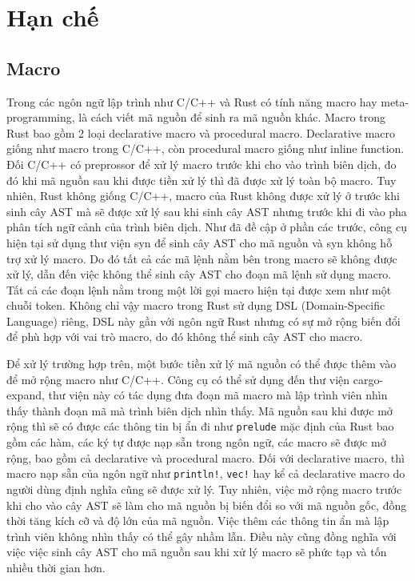 \section{Hạn chế}

\subsection{Macro}

Trong các ngôn ngữ lập trình như C/C++ và Rust có tính năng macro hay meta-programming, là cách viết mã nguồn để sinh ra mã nguồn khác.
Macro trong Rust bao gồm 2 loại declarative macro và procedural macro.
Declarative macro giống như macro trong C/C++, còn procedural macro giống như inline function.
Đối C/C++ có preprossor để xử lý macro trước khi cho vào trình biên dịch, đo đó khi mã nguồn sau khi được tiền xử lý thì đã được xử lý toàn bộ macro.
Tuy nhiên, Rust không giống C/C++, macro của Rust \cite{rustlangMacrosRust} không được xử lý ở trước khi sinh cây AST mà sẽ được xử lý sau khi sinh cây AST nhưng trước khi đi vào pha phân tích ngữ cảnh của trình biên dịch.
Như đã đề cập ở phần các trước, công cụ hiện tại sử dụng thư viện syn để sinh cây AST cho mã nguồn và syn không hỗ trợ xử lý macro.
Do đó tất cả các mã lệnh nằm bên trong macro sẽ không được xử lý, dẫn đến việc không thể sinh cây AST cho đoạn mã lệnh sử dụng macro.
Tất cả các đoạn lệnh nằm trong một lời gọi macro hiện tại được xem như một chuỗi token.
Không chỉ vậy macro trong Rust sử dụng DSL (Domain-Specific Language) riêng, DSL này gần với ngôn ngữ Rust nhưng có sự mở rộng biến đổi để phù hợp với vai trò macro, do đó không thể sinh cây AST cho macro.

Để xử lý trường hợp trên, một bước tiền xử lý mã nguồn có thể được thêm vào để mở rộng macro như C/C++.
Công cụ có thể sử dụng đến thư viện cargo-expand, thư viện này có tác dụng đưa đoạn mã macro mà lập trình viên nhìn thấy thành đoạn mã mà trình biên dịch nhìn thấy.
Mã nguồn sau khi được mở rộng thì sẽ có được các thông tin bị ẩn đi như \texttt{prelude} mặc định của Rust bao gồm các hàm, các ký tự được nạp sẵn trong ngôn ngữ, các macro sẽ được mở rộng, bao gồm cả declarative và procedural macro.
Đối với declarative macro, thì macro nạp sẵn của ngôn ngữ như \texttt{println!}, \texttt{vec!} hay kể cả declarative macro do người dùng định nghĩa cũng sẽ được xử lý.
Tuy nhiên, việc mở rộng macro trước khi cho vào cây AST sẽ làm cho mã nguồn bị biến đổi so với mã nguồn gốc, đồng thời tăng kích cỡ và độ lớn của mã nguồn.
Việc thêm các thông tin ẩn mà lập trình viên không nhìn thấy có thể gây nhầm lẫn.
Điều này cũng đồng nghĩa với việc việc sinh cây AST cho mã nguồn sau khi xử lý macro sẽ phức tạp và tốn nhiều thời gian hơn.

